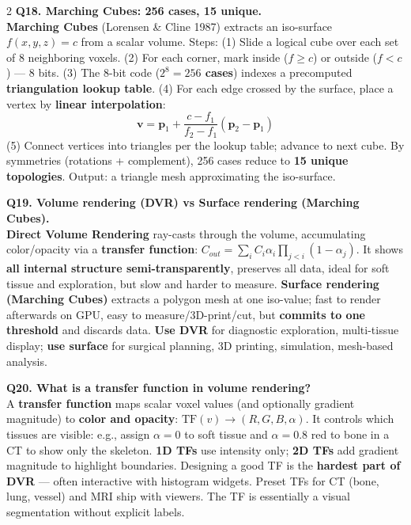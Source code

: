 \begin{paracol}{2}
\textbf{Q18. Marching Cubes: 256 cases, 15 unique.}\\
\textbf{Marching Cubes} (Lorensen \& Cline 1987) extracts an iso-surface $f(x,y,z) = c$ from a scalar volume. Steps: (1) Slide a logical cube over each set of 8 neighboring voxels. (2) For each corner, mark inside ($f \geq c$) or outside ($f < c$) --- 8 bits. (3) The 8-bit code (\textbf{$2^8 = 256$ cases}) indexes a precomputed \textbf{triangulation lookup table}. (4) For each edge crossed by the surface, place a vertex by \textbf{linear interpolation}:
$$\mathbf{v} = \mathbf{p}_1 + \frac{c - f_1}{f_2 - f_1}(\mathbf{p}_2 - \mathbf{p}_1)$$
(5) Connect vertices into triangles per the lookup table; advance to next cube. By symmetries (rotations + complement), 256 cases reduce to \textbf{15 unique topologies}. Output: a triangle mesh approximating the iso-surface.

\textbf{Q19. Volume rendering (DVR) vs Surface rendering (Marching Cubes).}\\
\textbf{Direct Volume Rendering} ray-casts through the volume, accumulating color/opacity via a \textbf{transfer function}: $C_{out} = \sum_i C_i \alpha_i \prod_{j<i}(1-\alpha_j)$. It shows \textbf{all internal structure semi-transparently}, preserves all data, ideal for soft tissue and exploration, but slow and harder to measure. \textbf{Surface rendering (Marching Cubes)} extracts a polygon mesh at one iso-value; fast to render afterwards on GPU, easy to measure/3D-print/cut, but \textbf{commits to one threshold} and discards data. \textbf{Use DVR} for diagnostic exploration, multi-tissue display; \textbf{use surface} for surgical planning, 3D printing, simulation, mesh-based analysis.

\textbf{Q20. What is a transfer function in volume rendering?}\\
A \textbf{transfer function} maps scalar voxel values (and optionally gradient magnitude) to \textbf{color and opacity}: $\mathrm{TF}(v) \to (R,G,B,\alpha)$. It controls which tissues are visible: e.g., assign $\alpha=0$ to soft tissue and $\alpha=0.8$ red to bone in a CT to show only the skeleton. \textbf{1D TFs} use intensity only; \textbf{2D TFs} add gradient magnitude to highlight boundaries. Designing a good TF is the \textbf{hardest part of DVR} --- often interactive with histogram widgets. Preset TFs for CT (bone, lung, vessel) and MRI ship with viewers. The TF is essentially a visual segmentation without explicit labels.


\end{paracol}
